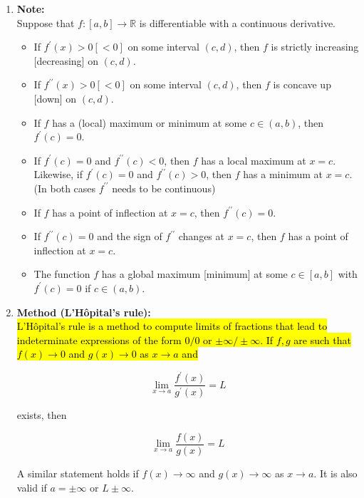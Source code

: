 \documentclass[10pt]{article}
\begin{document}
\begin{enumerate}
\item \textbf{Note:}\\
Suppose that $f:[a, b] \rightarrow \mathbb{R}$ is differentiable with a continuous derivative.

\begin{itemize}
  \item If $f^{\prime}(x)>0[<0]$ on some interval $(c, d)$, then $f$ is strictly increasing [decreasing] on $(c, d)$.

  \item If $f^{\prime \prime}(x)>0[<0]$ on some interval $(c, d)$, then $f$ is concave up [down] on $(c, d)$.

  \item If $f$ has a (local) maximum or minimum at some $c \in(a, b)$, then $f^{\prime}(c)=0$.

  \item If $f^{\prime}(c)=0$ and $f^{\prime \prime}(c)<0$, then $f$ has a local maximum at $x=c$. Likewise, if $f^{\prime}(c)=0$ and $f^{\prime \prime}(c)>0$, then $f$ has a minimum at $x=c$. (In both cases $f^{\prime \prime}$ needs to be continuous)

  \item If $f$ has a point of inflection at $x=c$, then $f^{\prime \prime}(c)=0$.

  \item If $f^{\prime \prime}(c)=0$ and the sign of $f^{\prime \prime}$ changes at $x=c$, then $f$ has a point of inflection at $x=c$.

  \item The function $f$ has a global maximum [minimum] at some $c \in[a, b]$ with $f^{\prime}(c)=0$ if $c \in(a, b)$.

\end{itemize}

\item \textbf{Method (L'Hôpital's rule):}\\
\hl{L'Hôpital's rule is a method to compute limits of fractions that lead to indeterminate expressions of the form $0 / 0$ or $\pm \infty / \pm \infty$. If $f, g$ are such that $f(x) \rightarrow 0$ and $g(x) \rightarrow 0$ as $x \rightarrow a$ and}

$$
\lim _{x \rightarrow a} \frac{f^{\prime}(x)}{g^{\prime}(x)}=L
$$

exists, then

$$
\lim _{x \rightarrow a} \frac{f(x)}{g(x)}=L
$$

A similar statement holds if $f(x) \rightarrow \infty$ and $g(x) \rightarrow \infty$ as $x \rightarrow a$. It is also valid if $a= \pm \infty$ or $L \pm \infty$.

\end{enumerate}
\end{document}
